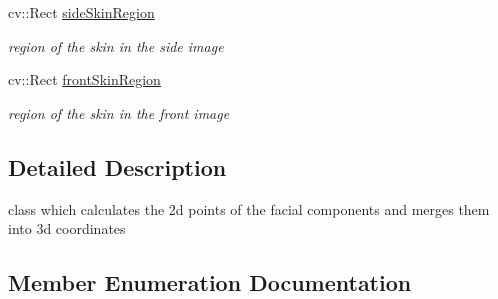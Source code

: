 \begin{DoxyCompactItemize}
cv\+::\+Rect \hyperlink{class_face3_d_1_1_face_geometry_a50fd03eb7de07088b36d3e4dea286b94}{side\+Skin\+Region}
\begin{DoxyCompactList}\small\item\em region of the skin in the side image \end{DoxyCompactList}\item 
cv\+::\+Rect \hyperlink{class_face3_d_1_1_face_geometry_aec3c5ac2a67745348df5aa68651bf616}{front\+Skin\+Region}
\begin{DoxyCompactList}\small\item\em region of the skin in the front image \end{DoxyCompactList}\end{DoxyCompactItemize}


\subsection{Detailed Description}
class which calculates the 2d points of the facial components and merges them into 3d coordinates 

\subsection{Member Enumeration Documentation}
